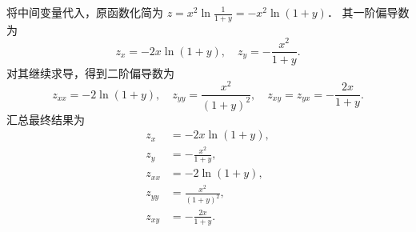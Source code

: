 \begin{solution}

    将中间变量代入，原函数化简为 $z = x^2 \ln \frac{1}{1+y} = -x^2 \ln(1+y)$．
    其一阶偏导数为
    \begin{equation}
        z_x = -2x \ln(1+y), \quad z_y = -\frac{x^2}{1+y}.
    \end{equation}
    对其继续求导，得到二阶偏导数为
    \begin{equation}
        z_{xx} = -2\ln(1+y), \quad z_{yy} = \frac{x^2}{(1+y)^2}, \quad z_{xy} = z_{yx} = -\frac{2x}{1+y}.
    \end{equation}
    汇总最终结果为
    \begin{equation}
        \boxed{
            \begin{aligned}
                z_x    & = -2x \ln(1+y),        \\
                z_y    & = -\frac{x^2}{1+y},    \\
                z_{xx} & = -2\ln(1+y),          \\
                z_{yy} & = \frac{x^2}{(1+y)^2}, \\
                z_{xy} & = -\frac{2x}{1+y}.
            \end{aligned}
        }
    \end{equation}



\end{solution}
